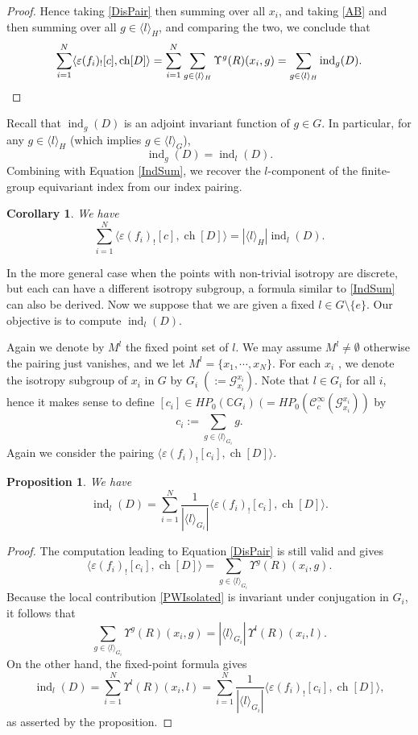 \documentclass[a4paper]{amsart}
\newcommand{\ch}{\operatorname{ch}}
\newcommand{\CC}{\mathbb C}
\newcommand{\ind}{\operatorname{ind}}
\newcommand{\maC}{\mathcal C}
\newcommand{\maG}{\mathcal G}
\newcommand\<{\langle}
\renewcommand\>{\rangle}
\newtheorem{prop}[theorem]{Proposition}
\newtheorem{cor}[theorem]{Corollary}
\theoremstyle{definition}
\theoremstyle{remark}
\begin{document}
\begin{proof}
Hence taking \eqref{DisPair} then summing over all $x_i$,
and taking \eqref{AB} and then summing over all $g \in \langle l \rangle _H$,
and comparing the two, we conclude that
\begin{equation}
\label{IndSum}
\sum _{i=1}^N \langle \varepsilon (f_i)_! [c] , \ch [ D ] \rangle
= \sum _{i=1}^N \sum _{g \in \langle l \rangle _H} \Upsilon^g(R)(x_i,g)
= \sum _{g \in \langle l \rangle _H} \ind _g (D). \qedhere
\end{equation}
\end{proof}

Recall that $\ind _g (D) $ is an adjoint invariant function of $g \in G$.
In particular, for any $g \in \langle l \rangle _H$ (which implies $g \in \langle l \rangle _G$),
$$ \ind _g (D) = \ind _l (D).$$
Combining with Equation \eqref{IndSum}, we recover the $l$-component
of the finite-group equivariant index from our index pairing.
\begin{cor}
We have
$$ \sum _{i=1}^N \langle \varepsilon (f_i)_! [c] , \ch [ D ] \rangle = |\langle l \rangle _H| \ind _l (D).$$
\end{cor}

In the more general case when the points with non-trivial isotropy are discrete,
but each can have a different isotropy subgroup,
a formula similar to \eqref{IndSum} can also be derived.
Now we suppose that we are given a fixed $l \in G \setminus \{ e \}$.
Our objective is to compute $\ind _l (D)$.

Again we denote by $M ^l$ the fixed point set of $l$.
We may assume $M^l \neq \emptyset$ otherwise the pairing just vanishes,
and we let $M ^l = \{ x_1 , \cdots, x_N \}$.
For each $x_i$ , we denote the isotropy subgroup of $x_i$ in $G$ by $G_i \; (:= \maG _{x_i} ^{x_i})$.
Note that $l \in G_i$ for all $i$,
hence it makes sense to define $[ c _i ] \in H P _0 (\CC G_i) \; ( = H P _0 (\maC ^\infty _c (\maG _{x_i} ^{x_i}))$ by
$$ c _i := \sum _{g \in \langle l \rangle _{G_i} } g.$$
Again we consider the pairing $\langle \varepsilon (f_i)_! [c _i] , \ch [ D ] \rangle $.

\begin{prop}
\label{EquivPairing}
We have
$$ \ind_l(D) = \sum _{i=1}^N \frac{1}{|\langle l \rangle_{G_i}|} \langle \varepsilon (f_i)_! [c _i] , \ch [ D ] \rangle .$$
\end{prop}

\begin{proof}
The computation leading to Equation \eqref{DisPair} is still valid and gives
$$ \langle \varepsilon (f_i)_! [c _i] , \ch [ D ] \rangle
= \sum _{g \in \langle l \rangle _{G_i}} \Upsilon^g (R) (x_i, g) .$$
Because the local contribution \eqref{PWIsolated} is invariant under conjugation in $G_i$,
it follows that
$$ \sum _{g \in \langle l \rangle _{G_i}} \Upsilon^g (R) (x_i, g) = |\langle l \rangle_{G_i}|\,\Upsilon^l(R)(x_i,l) .$$
On the other hand, the fixed-point formula gives
$$ \ind_l(D) = \sum_{i=1}^N \Upsilon^l (R) (x_i, l)
= \sum _{i=1}^N \frac{1}{|\langle l \rangle_{G_i}|} \langle \varepsilon (f_i)_! [c _i] , \ch [ D ] \rangle ,$$
as asserted by the proposition.
\end{proof}
\end{document}
